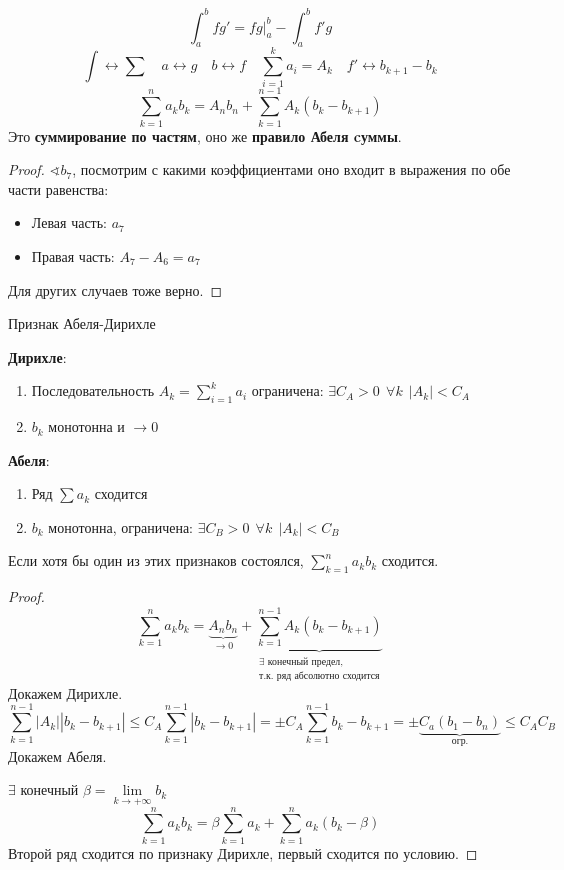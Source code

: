 

\cfoot{}

\renewcommand{\thesubsection}{\arabic{subsection}.}



$$\int_a^b fg' = fg\Big|_a^b - \int_a^b f'g$$
$$\int \leftrightarrow \sum \quad a\leftrightarrow g \quad b\leftrightarrow f \quad \sum_{i=1}^k a_i=A_k \quad f'\leftrightarrow b_{k+1}-b_k$$
$$\sum_{k=1}^n a_kb_k = A_nb_n + \sum_{k=1}^{n-1} A_k(b_k-b_{k+1})$$
Это \textbf{суммирование по частям}, оно же \textbf{правило Абеля cуммы}.
\begin{proof}
    $\sphericalangle b_7$, посмотрим с какими коэффициентами оно входит в выражения по обе части равенства:
    \begin{itemize}
        \item Левая часть: $a_7$
        \item Правая часть: $A_7-A_6=a_7$
    \end{itemize}
    Для других случаев тоже верно. %
\end{proof}

\begin{theorem}
    Признак Абеля-Дирихле

    \textbf{Дирихле}:
    \begin{enumerate}
        \item Последовательность $A_k=\sum\limits_{i=1}^k a_i$ ограничена: $\exists C_A > 0 \ \ \forall k \ \ |A_k|<C_A$
        \item $b_k$ монотонна и $\to0$
    \end{enumerate}

    \textbf{Абеля}:
    \begin{enumerate}
        \item Ряд $\sum a_k$ сходится
        \item $b_k$ монотонна, ограничена: $\exists C_B > 0 \ \ \forall k \ \ |A_k|<C_B$
    \end{enumerate}

    Если хотя бы один из этих признаков состоялся, $\sum\limits_{k=1}^n a_kb_k$ сходится.
\end{theorem}
\begin{proof}
    $$\sum_{k=1}^n a_kb_k = \underbrace{A_nb_n}_{\to0} + \underbrace{\sum_{k=1}^{n-1} A_k(b_k-b_{k+1})}_{\substack{\exists \text{ конечный предел,} \\ \text{т.к. ряд абсолютно сходится}}}$$
    Докажем Дирихле.
    $$\sum_{k=1}^{n-1}|A_k||b_k-b_{k+1}| \le C_A\sum_{k=1}^{n-1}|b_k-b_{k+1}|=\pm C_A\sum_{k=1}^{n-1}b_k-b_{k+1}=\pm \underbrace{C_a(b_1-b_n)}_{\text{огр.}}\le C_AC_B$$
    Докажем Абеля.

    $\exists$ конечный $\beta=\lim\limits_{k\to+\infty} b_k$
    $$\sum_{k=1}^n a_kb_k=\beta\sum_{k=1}^n a_k + \sum_{k=1}^n a_k(b_k-\beta)$$
    Второй ряд сходится по признаку Дирихле, первый сходится по условию.
\end{proof}

